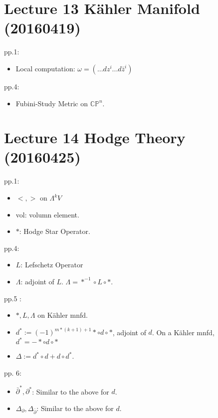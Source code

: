 \section{Lecture 13 Kähler Manifold (20160419)}
pp.1:
\begin{itemize}
    \item Local computation: $\omega = (...dz^i...d\bar{z}^i)$
\end{itemize}
pp.4:
\begin{itemize}
    \item Fubini-Study Metric on $\mathbb{CP}^n$.
\end{itemize}

\section{Lecture 14 Hodge Theory (20160425)}
pp.1:
\begin{itemize}
    \item $<,>$ on $\Lambda^k V$
    \item vol: volumn element.
    \item $*$: Hodge Star Operator.
\end{itemize}
pp.4:
\begin{itemize}
    \item $L$: Lefschetz Operator
    \item $\Lambda$: adjoint of $L$. $\Lambda = *^{-1}\circ L\circ *$.
\end{itemize}
pp.5 :
\begin{itemize}
    \item $*,L,\Lambda$ on Kähler mnfd.
    \item $d^*:= (-1)^{m*(k+1)+1}*\circ d\circ*$, adjoint of $d$. On a Kähler mnfd, $d^*= -*\circ d\circ*$
    \item $\Delta:=d^*\circ d + d\circ d^*$.
\end{itemize}
pp. 6:
\begin{itemize}
    \item $\bar{\partial}^*, \partial^*$: Similar to the above for $d$.
    \item $\Delta_\partial, \Delta_{\bar{\partial}}$: Similar to the above for $d$.
\end{itemize}
	
